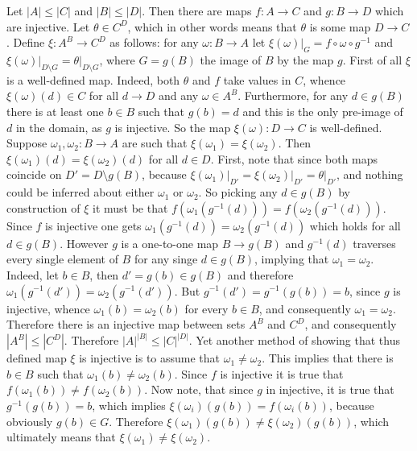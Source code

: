 \documentclass[a4paper]{article}
\newcommand{\brac}[1]{{\left({#1}\right)}}
\begin{document}
Let $|A|\leq |C|$ and $|B|\leq |D|$. Then there are maps $f:A\to C$ and $g:B\to D$ which are injective. Let $\theta\in C^D$, which in other words means that $\theta$ is some map $D\to C$. Define $\xi:A^B\to C^D$ as follows: for any $\omega:B\to A$ let $\xi(\omega)\vert_G = f\circ \omega \circ g^{-1}$ and $\xi(\omega)\vert_{D\setminus G} = \theta\vert_{D\setminus G}$, where $G = g(B)$ the image of $B$ by the map $g$.
First of all $\xi$ is a well-defined map. Indeed, both $\theta$ and $f$ take values in $C$, whence $\xi(\omega)(d)\in C$ for all $d\to D$ and any $\omega\in A^B$. Furthermore, for any $d\in g(B)$ there is at least one $b\in B$ such that $g(b)=d$ and this is the only pre-image of $d$ in the domain, as $g$ is injective. So the map $\xi(\omega): D\to C$ is well-defined.
Suppose $\omega_1, \omega_2:B\to A$ are such that $\xi(\omega_1) = \xi(\omega_2)$. Then $\xi(\omega_1)(d) = \xi(\omega_2)(d)$ for all $d\in D$. First, note that since both maps coincide on $D' = D\setminus g(B)$, because $\xi(\omega_1)\vert_{D'} = \xi(\omega_2)\vert_{D'} = \theta\vert_{D'}$, and nothing could be inferred about either $\omega_1$ or $\omega_2$. So picking any $d\in g(B)$ by construction of $\xi$ it must be that $f\brac{\omega_1\brac{g^{-1}(d)}} = f\brac{\omega_2\brac{g^{-1}(d)}}$. Since $f$ is injective one gets $\omega_1\brac{g^{-1}(d)} = \omega_2\brac{g^{-1}(d)}$ which holds for all $d\in g(B)$.
However $g$ is a one-to-one map $B\to g(B)$ and $g^{-1}(d)$ traverses every single element of $B$ for any singe $d\in g(B)$, implying that $\omega_1=\omega_2$. Indeed, let $b\in B$, then $d'=g(b)\in g(B)$ and therefore $\omega_1\brac{g^{-1}(d')} = \omega_2\brac{g^{-1}(d')}$. But $g^{-1}(d')=g^{-1}(g(b)) = b$, since $g$ is injective, whence $\omega_1(b) = \omega_2(b)$ for every $b\in B$, and consequently $\omega_1=\omega_2$. Therefore there is an injective map between sets $A^B$ and $C^D$, and consequently $|A^B|\leq |C^D|$. Therefore ${|A|}^{|B|}\leq {|C|}^{|D|}$.
Yet another method of showing that thus defined map $\xi$ is injective is to assume that $\omega_1\neq \omega_2$. This implies that there is $b\in B$ such that $\omega_1(b) \neq \omega_2(b)$. Since $f$ is injective it is true that $f\brac{\omega_1(b)}\neq f\brac{\omega_2(b)}$. Now note, that since $g$ in injective, it is true that $g^{-1}\brac{g(b)}=b$, which implies $\xi(\omega_i)\brac{g(b)} = f\brac{\omega_i(b)}$, because obviously $g(b)\in G$. Therefore $\xi(\omega_1)\brac{g(b)}\neq \xi(\omega_2)\brac{g(b)}$, which ultimately means that $\xi(\omega_1)\neq \xi(\omega_2)$.
\end{document}
